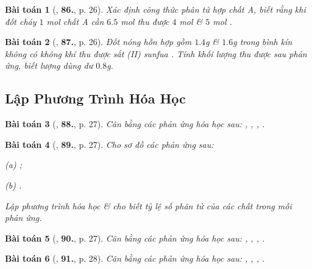 \documentclass{article}
\numberwithin{equation}{section}
\newtheorem{baitoan}{Bài toán}[section]
\begin{document}
\begin{baitoan}[\cite{An2011}, \textbf{86.}, p. 26]
	Xác định công thức phân tử hợp chất A, biết rằng khi đốt cháy $1$ mol chất A cần $6.5$ mol  thu được $4$ mol  \& $5$ mol .
\end{baitoan}

\begin{baitoan}[\cite{An2011}, \textbf{87.}, p. 26]
	Đốt nóng hỗn hợp gồm $1.4$g  \& $1.6$g  trong bình kín không có không khí thu được sắt (II) sunfua . Tính khối lượng  thu được sau phản ứng, biết lượng  dùng dư $0.8$g.
\end{baitoan}


\subsection{Lập Phương Trình Hóa Học}

\begin{baitoan}[\cite{An2011}, \textbf{88.}, p. 27]
	Cân bằng các phản ứng hóa học sau: \emph{, , , }. 
\end{baitoan}

\begin{baitoan}[\cite{An2011}, \textbf{89.}, p. 27]
	Cho sơ đồ các phản ứng sau:
	\begin{enumerate*}
		\item[(a)] \emph{};
		\item[(b)] \emph{}.
	\end{enumerate*}
	Lập phương trình hóa học \& cho biết tỷ lệ số phân tử của các chất trong mỗi phản ứng.
\end{baitoan}

\begin{baitoan}[\cite{An2011}, \textbf{90.}, p. 27]
	Cân bằng các phản ứng hóa học sau: \emph{, , , }.
\end{baitoan}

\begin{baitoan}[\cite{An2011}, \textbf{91.}, p. 28]
	Cân bằng các phản ứng hóa học sau: \emph{, , , }.
\end{baitoan}
\end{document}
